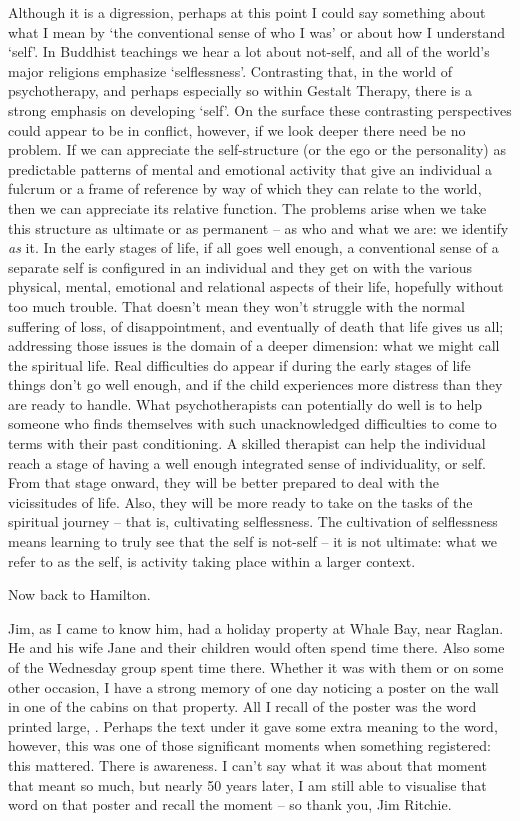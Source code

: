 Although it is a digression, perhaps at this point I could say something
about what I mean by `the conventional sense of who I was' or about how
I understand `self'. In Buddhist teachings we hear a lot about not-self,
and all of the world's major religions emphasize `selflessness'.
Contrasting that, in the world of psychotherapy, and perhaps especially
so within Gestalt Therapy, there is a strong emphasis on developing
`self'. On the surface these contrasting perspectives could appear to be
in conflict, however, if we look deeper there need be no problem. If we
can appreciate the self-structure (or the ego or the personality) as
predictable patterns of mental and emotional activity that give an
individual a fulcrum or a frame of reference by way of which they can
relate to the world, then we can appreciate its relative function. The
problems arise when we take this structure as ultimate or as permanent
-- as who and what we are: we identify \emph{as} it. In the early stages
of life, if all goes well enough, a conventional sense of a separate
self is configured in an individual and they get on with the various
physical, mental, emotional and relational aspects of their life,
hopefully without too much trouble. That doesn't mean they won't
struggle with the normal suffering of loss, of disappointment, and
eventually of death that life gives us all; addressing those issues is
the domain of a deeper dimension: what we might call the spiritual life.
Real difficulties do appear if during the early stages of life things
don't go well enough, and if the child experiences more distress than
they are ready to handle. What psychotherapists can potentially do well
is to help someone who finds themselves with such unacknowledged
difficulties to come to terms with their past conditioning. A skilled
therapist can help the individual reach a stage of having a well enough
integrated sense of individuality, or self. From that stage onward, they
will be better prepared to deal with the vicissitudes of life. Also,
they will be more ready to take on the tasks of the spiritual journey --
that is, cultivating selflessness. The cultivation of selflessness means
learning to truly see that the self is not-self -- it is not ultimate:
what we refer to as the self, is activity taking place within a larger
context.

Now back to Hamilton.

Jim, as I came to know him, had a holiday property at Whale Bay, near
Raglan. He and his wife Jane and their children would often spend time
there. Also some of the Wednesday group spent time there. Whether it was
with them or on some other occasion, I have a strong memory of one day
noticing a poster on the wall in one of the cabins on that property. All
I recall of the poster was the word printed large, . Perhaps
the text under it gave some extra meaning to the word, however, this was
one of those significant moments when something registered: this
mattered. There is awareness. I can't say what it was about that moment
that meant so much, but nearly 50 years later, I am still able to
visualise that word on that poster and recall the moment -- so thank
you, Jim Ritchie.

